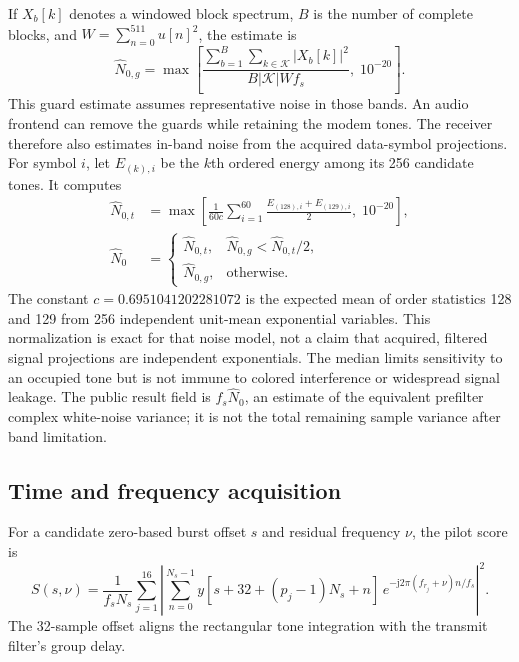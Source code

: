 \documentclass[11pt,a4paper]{article}
\newcommand{\Nzero}{\widehat{N}_0}
\begin{document}
If $X_b[k]$ denotes a windowed block spectrum, $B$ is the number of complete
blocks, and $W=\sum_{n=0}^{511}u[n]^2$, the estimate is
\begin{equation}
  \widehat N_{0,g}=\max\!\left[
    \frac{\sum_{b=1}^{B}\sum_{k\in\mathcal K}|X_b[k]|^2}
         {B|\mathcal K|Wf_s},\;10^{-20}\right].
  \label{eq:noiseestimate}
\end{equation}
This guard estimate assumes representative noise in those bands. An audio
frontend can remove the guards while retaining the modem tones. The receiver
therefore also estimates in-band noise from the acquired data-symbol
projections. For symbol $i$, let $E_{(k),i}$ be the $k$th ordered energy
among its 256 candidate tones. It computes
\begin{align}
 \widehat N_{0,t}
 &=\max\!\left[\frac{1}{60c}\sum_{i=1}^{60}
       \frac{E_{(128),i}+E_{(129),i}}{2},\;10^{-20}\right],
       \label{eq:tonenoise}\\
 \Nzero&=\begin{cases}
   \widehat N_{0,t},&\widehat N_{0,g}<\widehat N_{0,t}/2,\\
   \widehat N_{0,g},&\text{otherwise}.
 \end{cases} \label{eq:noiseselect}
\end{align}
The constant $c=0.6951041202281072$ is the expected mean of order statistics 128 and 129 from
256 independent unit-mean exponential variables. This normalization is exact
for that noise model, not a claim that acquired, filtered signal projections
are independent exponentials. The median limits sensitivity to an occupied
tone but is not immune to colored interference or widespread signal leakage.
The public result field  is $f_s\Nzero$, an estimate
of the equivalent prefilter complex white-noise variance; it is not the
total remaining sample variance after band limitation.

\subsection{Time and frequency acquisition}

For a candidate zero-based burst offset $s$ and residual frequency $\nu$,
the pilot score is
\begin{equation}
 S(s,\nu)=\frac{1}{f_sN_s}\sum_{j=1}^{16}
 \left|\sum_{n=0}^{N_s-1}
 y[s+32+(p_j-1)N_s+n]\,
 e^{-\mathrm{j}2\pi(f_{r_j}+\nu)n/f_s}\right|^2.
 \label{eq:pilotscore}
\end{equation}
The 32-sample offset aligns the rectangular tone integration with the
transmit filter's group delay.
\end{document}
